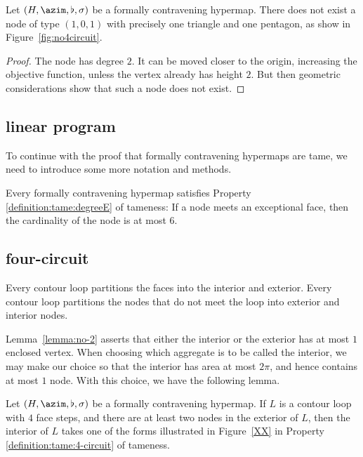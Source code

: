 \begin{lemma}\label{lemma:nobad4}
Let $(H,\azim,\flat,\sigma)$ be a formally contravening hypermap.
There does not exist a node of 
type $(1,0,1)$ with precisely one triangle and
one pentagon, as show in Figure~\ref{fig:no4circuit}. 
\end{lemma}

\begin{proof}  The node has degree $2$.  It can be moved closer
to the origin, increasing the objective function, unless the
vertex already has height $2$.  But then geometric considerations
show that such a node does not exist.
\end{proof}




\subsection{linear program} %
\label{sec:2.2}  To continue with the proof that formally
contravening hypermaps are tame, we need to introduce some more
notation and methods.

\begin{lemma} \label{lemma:deg5}
Every formally contravening hypermap satisfies Property
\ref{definition:tame:degreeE} of tameness: If a node meets an
exceptional face, then the cardinality of the node is at most $6$.
\end{lemma}


\subsection{four-circuit}

Every contour loop partitions the faces into the interior and
exterior.  Every contour loop partitions the nodes that do not meet
the loop into exterior and interior nodes.
%

Lemma~\ref{lemma:no-2} asserts that either the interior or the
exterior has at most $1$ enclosed vertex.   When choosing which
aggregate is to be called the interior, we may make our choice so
that the interior has area at most $2\pi$, and hence contains at
most $1$ node. With this choice, we have the following lemma.

\begin{lemma}
Let $(H,\azim,\flat,\sigma)$ be a formally contravening hypermap. If
$L$ is a contour loop with $4$ face steps, and there are at least
two nodes in the exterior of $L$, then the interior of $L$ takes one
of the forms illustrated in Figure~\ref{XX} in Property
    \ref{definition:tame:4-circuit} of tameness.
\end{lemma}

